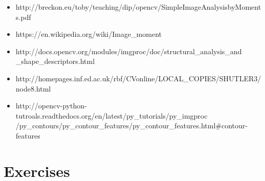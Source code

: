 \documentclass[]{article}
\providecommand{\tightlist}{%
  \setlength{\itemsep}{0pt}\setlength{\parskip}{0pt}}
\begin{document}
\begin{itemize}
\tightlist
\item
  http://breckon.eu/toby/teaching/dip/opencv/SimpleImageAnalysisbyMoments.pdf
\item
  https://en.wikipedia.org/wiki/Image\_moment
\item
  http://docs.opencv.org/modules/imgproc/doc/structural\_analysis\_and
  \_shape\_descriptors.html
\item
  http://homepages.inf.ed.ac.uk/rbf/CVonline/LOCAL\_COPIES/SHUTLER3/node8.html
\item
  http://opencv-python-tutroals.readthedocs.org/en/latest/py\_tutorials/py\_imgproc
  /py\_contours/py\_contour\_features/py\_contour\_features.html\#contour-features
\end{itemize}

\section{Exercises}\label{exercises}
\end{document}
